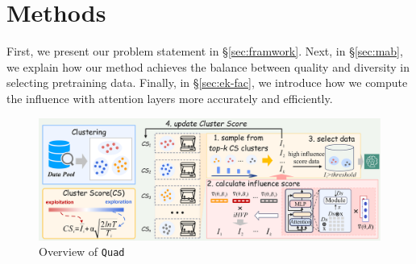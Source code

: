 \documentclass{article} %
\begin{document}
\section{Methods}
First, we present our problem statement in \S \ref{sec:framwork}. Next, in \S \ref{sec:mab}, we explain how our method achieves the  balance between quality and diversity in selecting pretraining data. Finally, in \S \ref{sec:ek-fac}, we 
introduce how we compute the influence with attention layers more accurately and efficiently.

\begin{figure}[h]
\begin{center}
\includegraphics[width=1\textwidth]{mab-new.png}
\end{center}
\caption{Overview of \texttt{Quad}}
\label{fig3}
  
  \begin{minipage}{1\textwidth}
    \small  %
  \end{minipage}
\end{figure}
\end{document}
